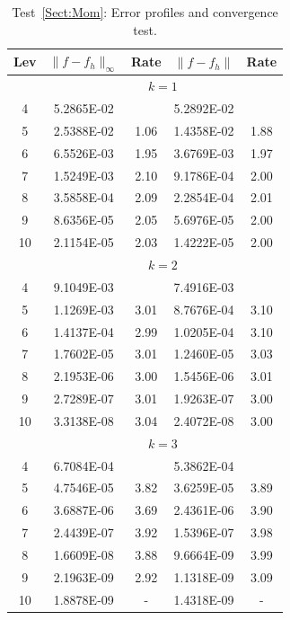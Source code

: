 \documentclass[preprint,11pt]{elsarticle}
\begin{document}
\begin{table}[H]
\caption{Test~\ref{Sect:Mom}: Error profiles and convergence test.}\label{Tab:Mom-2}
\centering
\begin{tabular}{c|cc|cc}	\hline\hline
Lev & $\|f-f_h\|_{\infty}$ & Rate & $\|f-f_h\|$ & Rate \\ \hline		
&\multicolumn{4}{c}{$k=1$}\\ \hline
4	&5.2865E-02	&		&5.2892E-02	&\\
5	&2.5388E-02	&1.06	&1.4358E-02	&1.88\\
6	&6.5526E-03	&1.95	&3.6769E-03	&1.97\\
7	&1.5249E-03	&2.10	&9.1786E-04	&2.00\\
8	&3.5858E-04	&2.09	&2.2854E-04	&2.01\\
9	&8.6356E-05	&2.05	&5.6976E-05	&2.00\\
10	&2.1154E-05	&2.03	&1.4222E-05	&2.00 \\ \hline		
&\multicolumn{4}{c}{$k=2$}\\ \hline
4	&9.1049E-03	&		&7.4916E-03	&\\
5	&1.1269E-03	&3.01	&8.7676E-04	&3.10\\
6	&1.4137E-04	&2.99	&1.0205E-04	&3.10\\
7	&1.7602E-05	&3.01	&1.2460E-05	&3.03\\
8	&2.1953E-06	&3.00	&1.5456E-06	&3.01\\
9	&2.7289E-07	&3.01	&1.9263E-07	&3.00\\
10	&3.3138E-08	&3.04	&2.4072E-08	&3.00 \\ \hline		
&\multicolumn{4}{c}{$k=3$}\\ \hline
4	&6.7084E-04	&		&5.3862E-04	&\\
5	&4.7546E-05	&3.82	&3.6259E-05	&3.89\\
6	&3.6887E-06	&3.69	&2.4361E-06	&3.90\\
7	&2.4439E-07	&3.92	&1.5396E-07	&3.98\\
8	&1.6609E-08	&3.88	&9.6664E-09	&3.99\\
9	&2.1963E-09	&2.92	&1.1318E-09	&3.09\\
10	&1.8878E-09	&-	&1.4318E-09	&- \\ \hline
\hline
\end{tabular}
\end{table}


\end{document}
